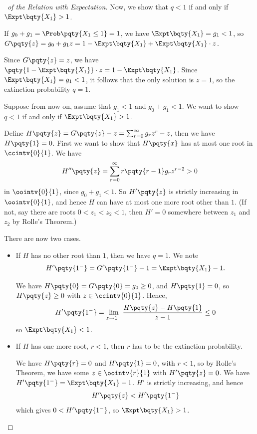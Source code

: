 \begin{proof}[\proofname\ of the Relation with Expectation]
    Now, we show that \(q < 1\) if and only if \(\Expt\bqty{X_1} > 1\).

    If \(g_0 + g_1 = \Prob\pqty{X_1 \leq 1} = 1\), we have \(\Expt\bqty{X_1} = g_1 < 1\), so \(G\pqty{z} = g_0 + g_1 z = 1 - \Expt\bqty{X_1} + \Expt\bqty{X_1} \cdot z\).

    Since \(G\pqty{z} = z\), we have \(\pqty{1 - \Expt\bqty{X_1}} \cdot z = 1 - \Expt\bqty{X_1}\). Since \(\Expt\bqty{X_1} = g_1 < 1\), it follows that the only solution is \(z = 1\), so the extinction probability \(q = 1\).

    Suppose from now on, assume that \(g_1 < 1\) and \(g_0 + g_1 < 1\). We want to show \(q < 1\) if and only if \(\Expt\bqty{X_1} > 1\).

    Define \(H\pqty{z} = G\pqty{z} - z = \sum_{r = 0}^{\infty} g_r z^r - z\), then we have \(H\pqty{1} = 0\). First we want to show that \(H\pqty{x}\) has at most one root in \(\ccintv{0}{1}\). We have
    \[
        H''\pqty{z} = \sum_{r = 0}^{\infty} r \pqty{r - 1} g_r z^{r - 2} > 0
    \]
    in \(\oointv{0}{1}\), since \(g_0 + g_1 < 1\). So \(H'\pqty{z}\) is strictly increasing in \(\oointv{0}{1}\), and hence \(H\) can have at most one more root other than \(1\). (If not, say there are roots \(0 < z_1 < z_2 < 1\), then \(H' = 0\) somewhere between \(z_1\) and \(z_2\) by Rolle's Theorem.)

    There are now two cases.
    
    \begin{itemize}
        \item If \(H\) has no other root than \(1\), then we have \(q = 1\). We note
        \[
            H'\pqty{1^-} = G'\pqty{1^-} - 1 = \Expt\bqty{X_1} - 1.
        \]

        We have \(H\pqty{0} = G\pqty{0} = g_0 \geq 0\), and \(H\pqty{1} = 0\), so \(H\pqty{z} \geq 0\) with \(z \in \ccintv{0}{1}\). Hence,
        \[
            H'\pqty{1^-} = \lim_{z \to 1^-}  \frac{H\pqty{z} - H\pqty{1}}{z - 1} \leq 0
        \]
        so \(\Expt\bqty{X_1} < 1\).

        \item If \(H\) has one more root, \(r < 1\), then \(r\) has to be the extinction probability.
        
        We have \(H\pqty{r} = 0\) and \(H\pqty{1} = 0\), with \(r < 1\), so by Rolle's Theorem, we have some \(z \in \oointv{r}{1}\) with \(H'\pqty{z} = 0\). We have \(H'\pqty{1^-} = \Expt\bqty{X_1} - 1\). \(H'\) is strictly increasing, and hence
        \[
            H'\pqty{z} < H'\pqty{1^-}
        \]
        which gives \(0 < H'\pqty{1^-}\), so \(\Expt\bqty{X_1} > 1\).
    \end{itemize}
\end{proof}
